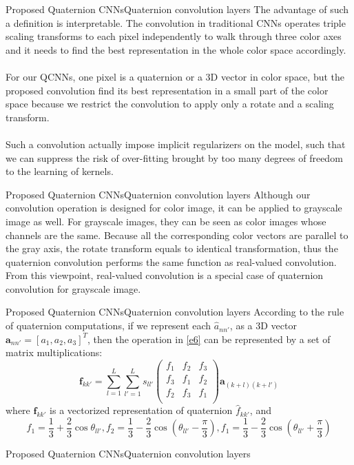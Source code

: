 \documentclass{beamer}
\begin{document}
\begin{frame}{Proposed Quaternion CNNs}{Quaternion convolution layers}
The advantage of such a definition is interpretable. The convolution in traditional CNNs operates triple scaling transforms to each pixel independently to walk through three color axes and it needs to find the best representation in the whole color space accordingly. 
\\~\\
For our QCNNs, one pixel is a quaternion or a 3D vector in color space, but the proposed convolution find its best representation in a small part of the color space because we restrict the convolution to apply only a rotate and a scaling transform.
\\~\\
Such a convolution actually impose implicit regularizers on the model, such that we can suppress the risk of over-fitting brought by too many degrees of freedom to the learning of kernels. 
\end{frame}

\begin{frame}{Proposed Quaternion CNNs}{Quaternion convolution layers}
Although our convolution operation is designed for color image, it can be applied to grayscale image as well. For grayscale images, they can be seen as color images whose channels are the same. Because all the corresponding color vectors are parallel to the gray axis, the rotate transform equals to identical transformation, thus the quaternion convolution performs the same function as real-valued convolution. From this viewpoint, real-valued convolution is a special case of quaternion convolution for grayscale image.
\end{frame}

\begin{frame}{Proposed Quaternion CNNs}{Quaternion convolution layers}
According to the rule of quaternion computations, if we represent each $\hat{a}_{nn'}$, as a 3D vector $\textbf{a}_{nn'}=[a_1,a_2,a_3]^T$, then the operation in \eqref{e6} can be represented by a set of matrix multiplications:
\begin{equation}
    \label{e7}
    \textbf{f}_{kk'}=\sum_{l=1}^L\sum_{l'=1}^Ls_{ll'}
    \begin{pmatrix}
        f_1&f_2&f_3\\
        f_3&f_1&f_2\\
        f_2&f_3&f_1\\
    \end{pmatrix}
    \textbf{a}_{(k+l)(k+l')}
\end{equation}
where $\textbf{f}_{kk'}$ is a vectorized representation of quaternion $\hat{f}_{kk'}$, and 
$$f_1=\frac{1}{3}+\frac{2}{3}\cos\theta_{ll'},f_2=\frac{1}{3}-\frac{2}{3}\cos(\theta_{ll'}-\frac{\pi}{3}),f_1=\frac{1}{3}-\frac{2}{3}\cos(\theta_{ll'}+\frac{\pi}{3})$$
\end{frame}

\begin{frame}{Proposed Quaternion CNNs}{Quaternion convolution layers}
    
\end{frame}
\end{document}
